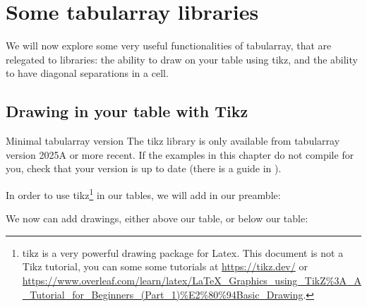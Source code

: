 \chapter{Some tabularray libraries}\label{sec:libraries}

We will now explore some very useful functionalities of tabularray, that are relegated to libraries: the ability to draw on your table using tikz, and the ability to have diagonal separations in a cell.

\section{Drawing in your table with Tikz}
\begin{warningbox}{Minimal tabularray version}
The tikz library is only available from tabularray version 2025A or more recent. If the examples in this chapter do not compile for you, check that your version is up to date (there is a guide in ).
\end{warningbox}

In order to use tikz\footnote{tikz is a very powerful drawing package for Latex. This document is not a Tikz tutorial, you can some some tutorials at \url{https://tikz.dev/} or \url{https://www.overleaf.com/learn/latex/LaTeX_Graphics_using_TikZ\%3A_A_Tutorial_for_Beginners_(Part_1)\%E2\%80\%94Basic_Drawing}.} in our tables, we will add  in our preamble:


We now can add drawings, either above our table, or below our table:

\begin{Code}
\begin{tblrtikzbelow}
\end{tblrtikzbelow}

\begin{tblrtikzabove}
\end{tblrtikzabove}

\begin{tblr}{}
\end{tblr}
\end{Code}

